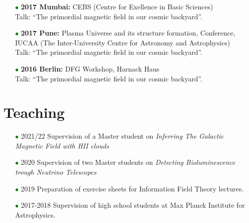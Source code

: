 \documentclass[11pt,a4paper,sans, table, dvipsnames]{moderncv}        %
\begin{document}
\begin{itemize}
\item[\textcolor{Green}{$\bullet$}]{\textbf{2017 Mumbai:} CEBS (Centre for Exellence in Basic
Sciences) \\ Talk: ``The primordial magnetic field in our cosmic backyard''.}

\item[\textcolor{Green}{$\bullet$}]{\textbf{2017 Pune:} Plasma Universe and its structure formation, Conference, IUCAA (The Inter-University Centre for Astronomy and Astrophysics)\\ Talk: ``The primordial magnetic field in our cosmic backyard''.}

\item[\textcolor{Green}{$\bullet$}]{\textbf{2016 Berlin:} DFG Workshop, Harnack Haus\\ Talk: ``The primordial magnetic field in our cosmic backyard''.}
\end{itemize}

\vspace{\baselineskip}
\section{Teaching}
\begin{itemize}
\item[\textcolor{Green}{$\bullet$}] 2021/22 Supervision of a Master student
on  \textit{Inferring The Galactic Magnetic Field with HII clouds}
\vspace{5pt}

\item[\textcolor{Green}{$\bullet$}] 2020 Supervision of two Master students on
\textit{Detecting Bioluminescence trough Neutrino Telescopes}

\vspace{5pt}

\item[\textcolor{Green}{$\bullet$}] 2019 Preparation of exercise sheets for Information Field Theory lectures.

\vspace{5pt}

\item[\textcolor{Green}{$\bullet$}] 2017-2018 Supervision of high school students at Max Planck Institute for Astrophysics.
\end{itemize}



\end{document}
